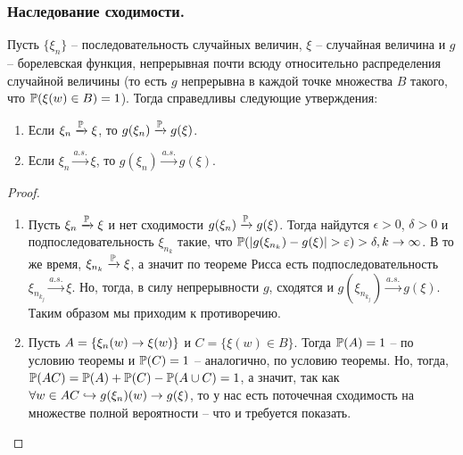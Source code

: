 \subsubsection{Наследование сходимости.}
\begin{theorem}
    Пусть $\{\xi_n\}$ -- последовательность случайных величин, $\xi$ -- случайная величина и $g$ -- борелевская функция, непрерывная почти всюду относительно распределения случайной величины (то есть $g$  непрерывна в каждой точке множества $B$ такого, что $\P(\xi(w) \in B) = 1$).
    Тогда справедливы следующие утверждения:
    \begin{enumerate}
        \item Если $\xi_n \xrightarrow{\P} \xi$, то $g(\xi_n) \xrightarrow{\P} g(\xi)$.
        \item Если $\xi_n \xrightarrow{a.s.} \xi$, то $g(\xi_n) \xrightarrow{a.s.} g(\xi)$.
    \end{enumerate}
\end{theorem}
\begin{proof} \leavevmode
    \begin{enumerate}
        \item Пусть $\xi_n \xrightarrow{\P} \xi$ и нет сходимости $g(\xi_n) \xrightarrow{\P} g(\xi)$. Тогда найдутся $\epsilon > 0$, $\delta > 0$ и подпоследовательность $\xi_{n_k}$ такие, что $\P(|g(\xi_{n_k}) - g(\xi)| > \epsilon) > \delta, k \ra \infty$. В то же время, $\xi_{n_k} \xrightarrow{\P} \xi$, а значит по теореме Рисса есть подпоследовательность $\xi_{n_{k_j}} \xrightarrow{a.s.} \xi$. Но, тогда, в силу непрерывности $g$, сходятся и $g(\xi_{n_{k_j}}) \xrightarrow{a.s.} g(\xi)$. Таким образом мы приходим к противоречию.
        \item Пусть $A = \{\xi_n(w) \ra \xi(w)\}$ и $C = \{\xi(w) \in B\}$. Тогда $\P(A) = 1$ -- по условию теоремы и $\P(C) = 1$ -- аналогично, по условию теоремы. Но, тогда, $\P(AC) = \P(A) + \P(C) - \P(A \cup C) = 1$, а значит, так как $\forall w \in AC \hookrightarrow g(\xi_n)(w) \ra g(\xi)$, то у нас есть поточечная сходимость на множестве полной вероятности -- что и требуется показать.
    \end{enumerate}
\end{proof}
